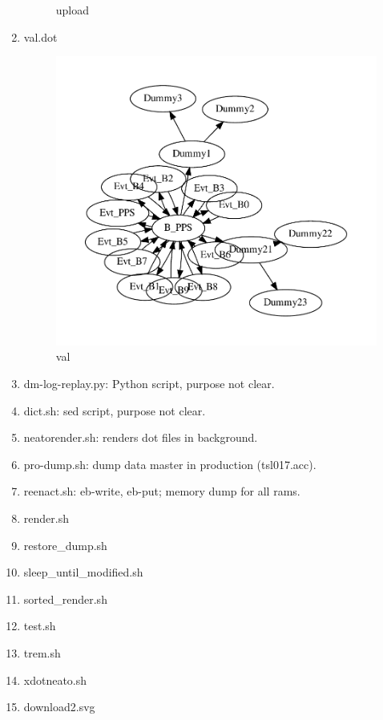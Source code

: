 \documentclass[12pt,a4paper]{report}
\begin{document}
\begin{enumerate}
\begin{figure}
        \caption{upload}
        \label{fig:upload}
    \end{figure}
\item val.dot
    \begin{figure}
        \centering 
        \includegraphics*[width=1.0\textwidth,keepaspectratio]{TestPattern/val.pdf}
        \caption{val}
        \label{fig:val}
    \end{figure}
\item dm-log-replay.py: Python script, purpose not clear.
\item dict.sh: sed script, purpose not clear.
\item neatorender.sh: renders dot files in background.
\item pro-dump.sh: dump data master in production (tsl017.acc).
\item reenact.sh: eb-write, eb-put; memory dump for all rams.
\item render.sh
\item restore\_dump.sh
\item sleep\_until\_modified.sh
\item sorted\_render.sh
\item test.sh
\item trem.sh
\item xdotneato.sh
\item download2.svg
\end{enumerate}
\end{document}
